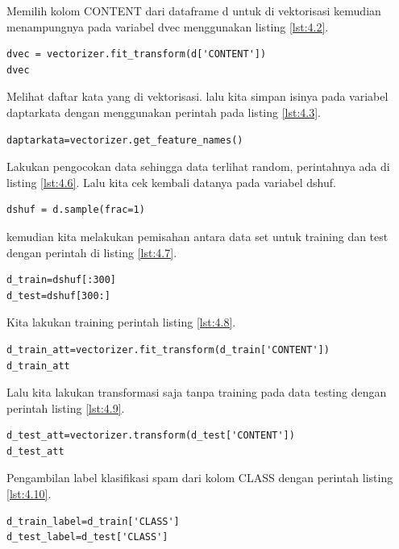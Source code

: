 Memilih kolom CONTENT dari dataframe d untuk di vektorisasi kemudian menampungnya pada variabel dvec menggunakan listing \ref{lst:4.2}.
\begin{lstlisting}[caption=Vektorisasi data dari atribut CONTENT,label={lst:4.2}]
dvec = vectorizer.fit_transform(d['CONTENT'])
dvec
\end{lstlisting}

Melihat daftar kata yang di vektorisasi. lalu kita simpan isinya pada variabel daptarkata dengan menggunakan perintah pada listing \ref{lst:4.3}.
\begin{lstlisting}[caption=Mendapatkan Daftar Kata,label={lst:4.3}]
daptarkata=vectorizer.get_feature_names()
\end{lstlisting}


Lakukan pengocokan data sehingga data terlihat random, perintahnya ada di listing \ref{lst:4.6}. Lalu kita cek kembali datanya pada variabel dshuf.
\begin{lstlisting}[caption=Mengocok Data Frame,label={lst:4.6}]
dshuf = d.sample(frac=1)
\end{lstlisting}

kemudian kita melakukan pemisahan antara data set untuk training dan test dengan perintah di listing \ref{lst:4.7}.
\begin{lstlisting}[caption=Memisahkan data frame,label={lst:4.7}]
d_train=dshuf[:300]
d_test=dshuf[300:]
\end{lstlisting}

Kita lakukan training perintah listing \ref{lst:4.8}.
\begin{lstlisting}[caption=Training pada vektorisasi atau yang disebut transform dan fit,label={lst:4.8}]
d_train_att=vectorizer.fit_transform(d_train['CONTENT'])
d_train_att
\end{lstlisting}

Lalu kita lakukan transformasi saja tanpa training pada data testing dengan perintah listing \ref{lst:4.9}.
\begin{lstlisting}[caption=Transform tanpa fit dari data testing,label={lst:4.9}]
d_test_att=vectorizer.transform(d_test['CONTENT'])
d_test_att
\end{lstlisting}

Pengambilan label klasifikasi spam dari kolom CLASS dengan perintah listing \ref{lst:4.10}.
\begin{lstlisting}[caption=Pengambilan label dari data testing dan training,label={lst:4.10}]
d_train_label=d_train['CLASS']
d_test_label=d_test['CLASS']
\end{lstlisting}



